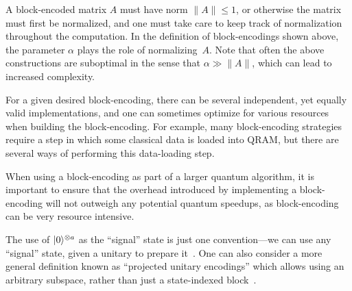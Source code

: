 \begin{refsection}
A block-encoded matrix $A$ must have norm $\|A\|\leq 1$, or otherwise the matrix must first be normalized, and one must take care to keep track of normalization throughout the computation. In the definition of block-encodings shown above, the parameter $\alpha$ plays the role of normalizing~$A$. Note that often the above constructions are suboptimal in the sense that $\alpha\gg \|A\|$, which can lead to increased complexity.

For a given desired block-encoding, there can be several independent, yet equally valid implementations, and one can sometimes optimize for various resources when building the block-encoding. For example, many block-encoding strategies require a step in which some classical data is loaded into QRAM, but there are several ways of performing this data-loading step.

When using a block-encoding as part of a larger quantum algorithm, it is important to ensure that the overhead introduced by implementing a block-encoding will not outweigh any potential quantum speedups, as block-encoding can be very resource intensive.

The use of $\lvert0\rangle^{\otimes a}$ as the ``signal'' state is just one convention---we can use any ``signal'' state, given a unitary to prepare it~\cite{low2016HamSimQubitization}. One can also consider a more general definition known as ``projected unitary encodings'' which allows using an arbitrary subspace, rather than just a state-indexed block~\cite{gilyen2018QSingValTransf}.



\end{refsection}
